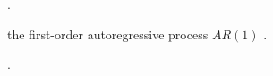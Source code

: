 \documentclass[../thesis.tex]{subfiles}
\begin{document}
\begin{definition}
	\cite[Lecture 5, p.4]{solis-garcia_ucb_2022}.
\end{definition}

\begin{definition}
	the first-order autoregressive process $AR(1)$ \cite[Lecture 5, p.4]{solis-garcia_ucb_2022}.
\end{definition}

\begin{definition}
	\cite[Hands on 5, p.14]{solis-garcia_ucb_2022}.
\end{definition}
















\end{document}
